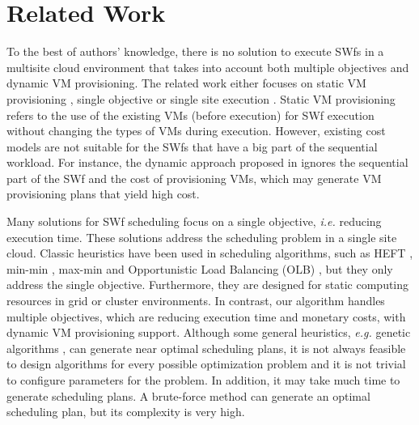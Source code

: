 \section{Related Work}
\label{sec:rw}

To the best of authors' knowledge, there is no solution to execute SWfs in a multisite cloud environment that takes into account both multiple objectives and dynamic VM provisioning. The related work either focuses on static VM provisioning \cite{Duan2014}, single objective \cite{Anglano2008,Maheswaran1999,Rahman2013,Smanchat2009,Topcuouglu2002,Yu2007, Wieczorek2005,Etminani2007,Maheswaran1999,Liu2014} or single site execution \cite{Oliveira2012,Fard2014,Rodriguez2015}. Static VM provisioning refers to the use of the existing VMs (before execution) for SWf execution without changing the types of VMs during execution. However, existing cost models are not suitable for the SWfs that have a big part of the sequential workload. For instance, the dynamic approach proposed in \cite{Coutinho2014} ignores the sequential part of the SWf and the cost of provisioning VMs, which may generate VM provisioning plans that yield high cost. 

Many solutions for SWf scheduling \cite{Anglano2008,Maheswaran1999,Rahman2013,Smanchat2009,Topcuouglu2002,Yu2007} focus on a single objective, \textit{i.e.} reducing execution time. These solutions address the scheduling problem in a single site cloud. Classic heuristics have been used in scheduling
algorithms, such as HEFT \cite{Wieczorek2005}, min-min \cite{Etminani2007}, max-min \cite{Etminani2007} and Opportunistic Load Balancing (OLB) \cite{Maheswaran1999}, but they only address the single objective. Furthermore, they are designed for static computing resources in grid or cluster environments.
In contrast, our algorithm handles multiple objectives, which are reducing execution time and monetary costs, with dynamic VM provisioning support.
Although some general heuristics, \textit{e.g.} genetic algorithms \cite{Wieczorek2005}, can generate near optimal scheduling plans, it is not always feasible to design algorithms for every possible optimization problem \cite{Wieczorek2005} and it is not trivial to configure parameters for the problem. In addition, it may take much time to generate scheduling plans. A brute-force method can generate an optimal scheduling plan, but its complexity is very high.

